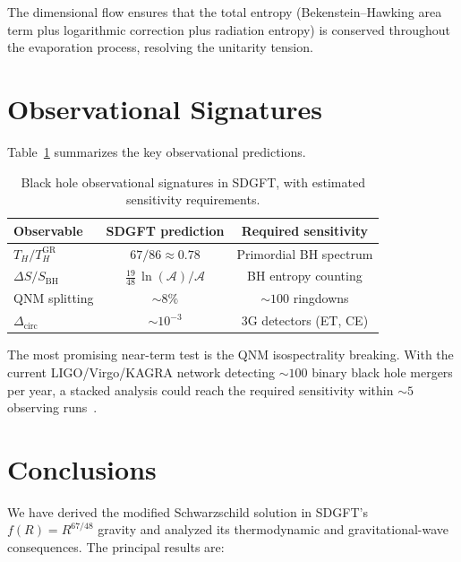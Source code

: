 \documentclass[amsmath,amssymb,aps,prd,twocolumn,superscriptaddress,nofootinbib]{revtex4-2}
\begin{document}
The dimensional flow ensures that the total entropy (Bekenstein--Hawking
area term plus logarithmic correction plus radiation entropy)
is conserved throughout the evaporation process, resolving the
unitarity tension.

\section{Observational Signatures}
\label{sec:observational}

Table~\ref{tab:signatures} summarizes the key observational
predictions.

\begin{table}[t]
\centering
\caption{Black hole observational signatures in SDGFT, with
estimated sensitivity requirements.}
\label{tab:signatures}
\begin{tabular}{@{}lcc@{}}
\toprule
Observable & SDGFT prediction & Required sensitivity \\
\midrule
$T_H/T_H^{\mathrm{GR}}$ & $67/86 \approx 0.78$
  & Primordial BH spectrum \\
$\Delta S / S_{\mathrm{BH}}$ & $\tfrac{19}{48}\,\ln(\mathcal{A})/\mathcal{A}$
  & BH entropy counting \\
QNM splitting & $\sim 8\%$ & $\sim 100$ ringdowns \\
$\Delta_{\mathrm{circ}}$ & $\sim 10^{-3}$
  & 3G detectors (ET, CE) \\
\bottomrule
\end{tabular}
\end{table}

The most promising near-term test is the QNM isospectrality
breaking.  With the current LIGO/Virgo/KAGRA network detecting
$\sim 100$ binary black hole mergers per year, a stacked
analysis could reach the required sensitivity within $\sim 5$
observing runs~\cite{Isi2019}.

\section{Conclusions}
\label{sec:conclusions}

We have derived the modified Schwarzschild solution in SDGFT's
$f(R) = R^{67/48}$ gravity and analyzed its thermodynamic and
gravitational-wave consequences.  The principal results are:
\end{document}
